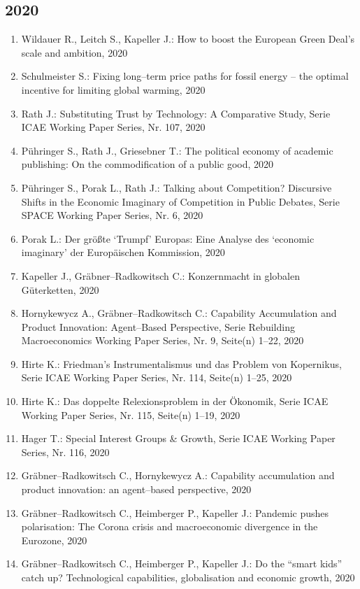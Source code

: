 \subsection*{2020}
\begin{enumerate}
    	 \item Wildauer R., Leitch S., Kapeller J.: How to boost the European Green Deal’s scale and ambition, 2020
	 \item Schulmeister S.: Fixing long--term price paths for fossil energy – the optimal incentive for limiting global warming, 2020
	 \item Rath J.: Substituting Trust by Technology: A Comparative Study, Serie ICAE Working Paper Series, Nr. 107, 2020
	 \item Pühringer S., Rath J., Griesebner T.: The political economy of academic publishing: On the commodification of a public good, 2020
	 \item Pühringer S., Porak L., Rath J.: Talking about Competition? Discursive Shifts in the Economic Imaginary of Competition in Public Debates, Serie SPACE Working Paper Series, Nr. 6, 2020
	 \item Porak L.: Der größte ‘Trumpf’ Europas: Eine Analyse des ‘economic imaginary’ der Europäischen Kommission, 2020
	 \item Kapeller J., Gräbner--Radkowitsch C.: Konzernmacht in globalen Güterketten, 2020
	 \item Hornykewycz A., Gräbner--Radkowitsch C.: Capability Accumulation and Product Innovation: Agent--Based Perspective, Serie Rebuilding Macroeconomics Working Paper Series, Nr. 9, Seite(n) 1--22, 2020
	 \item Hirte K.: Friedman’s Instrumentalismus und das Problem von Kopernikus, Serie ICAE Working Paper Series, Nr. 114, Seite(n) 1--25, 2020
	 \item Hirte K.: Das doppelte Relexionsproblem in der Ökonomik, Serie ICAE Working Paper Series, Nr. 115, Seite(n) 1--19, 2020
	 \item Hager T.: Special Interest Groups \& Growth, Serie ICAE Working Paper Series, Nr. 116, 2020
	 \item Gräbner--Radkowitsch C., Hornykewycz A.: Capability accumulation and product innovation: an agent--based perspective, 2020
	 \item Gräbner--Radkowitsch C., Heimberger P., Kapeller J.: Pandemic pushes polarisation: The Corona crisis and macroeconomic divergence in the Eurozone, 2020
	 \item Gräbner--Radkowitsch C., Heimberger P., Kapeller J.: Do the “smart kids” catch up? Technological capabilities, globalisation and economic growth, 2020

\end{enumerate}
